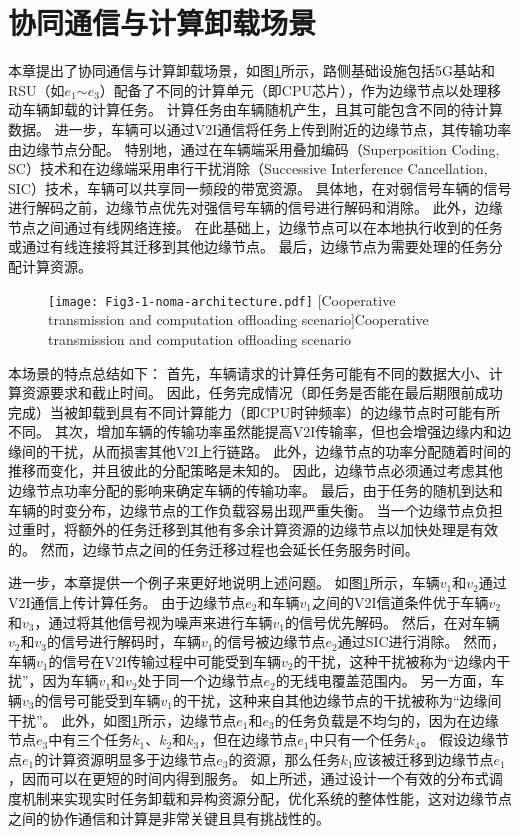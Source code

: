 \section{协同通信与计算卸载场景}\label{section 3-2}

本章提出了协同通信与计算卸载场景，如图\ref{fig 3-1}所示，路侧基础设施包括5G基站和RSU（如$e_1$$\sim$$e_3$）配备了不同的计算单元（即CPU芯片），作为边缘节点以处理移动车辆卸载的计算任务。
计算任务由车辆随机产生，且其可能包含不同的待计算数据。
进一步，车辆可以通过V2I通信将任务上传到附近的边缘节点，其传输功率由边缘节点分配。
特别地，通过在车辆端采用叠加编码（Superposition Coding, SC）技术和在边缘端采用串行干扰消除（Successive Interference Cancellation, SIC）\cite{khan2021noma}技术，车辆可以共享同一频段的带宽资源。
具体地，在对弱信号车辆的信号进行解码之前，边缘节点优先对强信号车辆的信号进行解码和消除。
此外，边缘节点之间通过有线网络连接。
在此基础上，边缘节点可以在本地执行收到的任务或通过有线连接将其迁移到其他边缘节点。
最后，边缘节点为需要处理的任务分配计算资源。

\begin{figure}[h]
\centering
  \texttt{[image: Fig3-1-noma-architecture.pdf]}
  [Cooperative transmission and computation offloading scenario]{Cooperative transmission and computation offloading scenario}
  \label{fig 3-1}
\end{figure} 

本场景的特点总结如下：
首先，车辆请求的计算任务可能有不同的数据大小、计算资源要求和截止时间。
因此，任务完成情况（即任务是否能在最后期限前成功完成）当被卸载到具有不同计算能力（即CPU时钟频率）的边缘节点时可能有所不同。
其次，增加车辆的传输功率虽然能提高V2I传输率，但也会增强边缘内和边缘间的干扰，从而损害其他V2I上行链路。
此外，边缘节点的功率分配随着时间的推移而变化，并且彼此的分配策略是未知的。
因此，边缘节点必须通过考虑其他边缘节点功率分配的影响来确定车辆的传输功率。
最后，由于任务的随机到达和车辆的时变分布，边缘节点的工作负载容易出现严重失衡。
当一个边缘节点负担过重时，将额外的任务迁移到其他有多余计算资源的边缘节点以加快处理是有效的。
然而，边缘节点之间的任务迁移过程也会延长任务服务时间。

进一步，本章提供一个例子来更好地说明上述问题。
如图\ref{fig 3-1}所示，车辆$v_1$和$v_2$通过V2I通信上传计算任务。
由于边缘节点$e_2$和车辆$v_1$之间的V2I信道条件优于车辆$v_2$和$v_3$，通过将其他信号视为噪声来进行车辆$v_1$的信号优先解码。
然后，在对车辆$v_2$和$v_3$的信号进行解码时，车辆$v_1$的信号被边缘节点$e_2$通过SIC进行消除。
然而，车辆$v_1$的信号在V2I传输过程中可能受到车辆$v_2$的干扰，这种干扰被称为“边缘内干扰”，因为车辆$v_1$和$v_2$处于同一个边缘节点$e_2$的无线电覆盖范围内。
另一方面，车辆$v_3$的信号可能受到车辆$v_1$的干扰，这种来自其他边缘节点的干扰被称为“边缘间干扰”。
此外，如图\ref{fig 3-1}所示，边缘节点$e_1$和$e_3$的任务负载是不均匀的，因为在边缘节点$e_3$中有三个任务$k_1$、$k_2$和$k_3$，但在边缘节点$e_1$中只有一个任务$k_4$。
假设边缘节点$e_1$的计算资源明显多于边缘节点$e_3$的资源，那么任务$k_1$应该被迁移到边缘节点$e_1$，因而可以在更短的时间内得到服务。
如上所述，通过设计一个有效的分布式调度机制来实现实时任务卸载和异构资源分配，优化系统的整体性能，这对边缘节点之间的协作通信和计算是非常关键且具有挑战性的。

